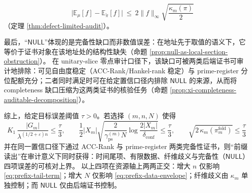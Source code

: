 \begin{theorem}
\begin{equation}
{\qquad
\bigl|\mathbb{E}_\mu[f]-\mathbb{E}_{\widetilde\pi}[f]\bigr|
\ \le\
2\|f\|_\infty\sqrt{\frac{\kappa_m(\pi)}{2}}\;}
\end{equation}
（定理 \ref{thm:defect-limited-audit}）。
\par
最后，“\(\mathsf{NULL}\)”体现的是完备性缺口而非数值误差：在地址先于取值的语义下，它等价于证书对象在该地址处的结构性缺失（命题 \ref{prop:null-as-local-section-obstruction}）。
在 unitary-slice 零点审计口径下，该缺口可被两类后端证书可审计地排除：可见自由度稳定（ACC-Rank/Hankel-rank 稳定）与 prime-register 分位配额充分；二者同时满足时可在给定置信口径内排除 \(\mathsf{NULL}\) 的来源，从而将 completeness 缺口压缩为这两类证书的核验任务（命题 \ref{prop:xi-completeness-auditable-decomposition}）。
\par
综上，给定目标误差阈值 \(\tau>0\)。若选择 \((m,n,N)\) 使得
\begin{equation}\label{eq:prefix-audit-budget-sufficient}
\boxed{\;
K_1\,\frac{|G_m|}{\lambda^{(1/2+\varepsilon)n}}\le \frac{\tau}{3},
\qquad
\frac12|X_m|\sqrt{\frac{2}{\gamma_{\mathrm{ps}}^{(m)}N}\log\frac{2|X_m|}{\delta_{\mathrm{conf}}}}\le \frac{\tau}{3},
\qquad
\sqrt{2\,\kappa_m(\pi_m^{\mathrm{fold}})}\le \frac{\tau}{3}\;}
\end{equation}
并在同一置信口径下通过 ACC-Rank 与 prime-register 两类完备性证书，则“前缀读出”在审计意义下同时获得：时间尾项、有限数据、纤维歧义与完备性（\(\mathsf{NULL}\)）四项误差的可核对上界。
以上四项在资源轴上两两正交：增大 \(n\) 仅影响 \eqref{eq:prefix-tail-term}；增大 \(N\) 仅影响 \eqref{eq:prefix-data-envelope}；纤维歧义由 \(\kappa_m\) 单独控制；而 \(\mathsf{NULL}\) 仅由后端证书控制。
\end{theorem}

